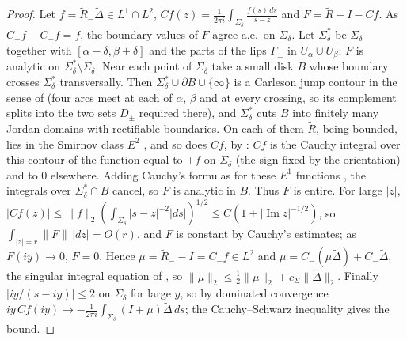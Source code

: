 \documentclass[11pt]{amsart}
\theoremstyle{definition}
\theoremstyle{remark}
\numberwithin{equation}{section}
\DeclareMathOperator{\im}{Im}
\begin{document}
\begin{proof}
Let $f=\widetilde R_-\widetilde\Delta\in L^1\cap L^2$, $Cf(z)=\frac1{2\pi i}\int_{\Sigma_\delta}\frac{f(s)\,ds}{s-z}$ and $F=\widetilde R-I-Cf$. As $C_+f-C_-f=f$, the boundary values of $F$ agree a.e.\ on $\Sigma_\delta$. Let $\Sigma_\delta^*$ be $\Sigma_\delta$ together with $[\alpha-\delta,\beta+\delta]$ and the parts of the lips $\Gamma_\pm$ in $U_\alpha\cup U_\beta$; $F$ is analytic on $\Sigma_\delta^*\setminus\Sigma_\delta$. Near each point of $\Sigma_\delta$ take a small disk $B$ whose boundary crosses $\Sigma_\delta^*$ transversally. Then $\Sigma_\delta^*\cup\partial B\cup\{\infty\}$ is a Carleson jump contour in the sense of \cite[\S3.2]{Le} (four arcs meet at each of $\alpha$, $\beta$ and at every crossing, so its complement splits into the two sets $D_\pm$ required there), and $\Sigma_\delta^*$ cuts $B$ into finitely many Jordan domains with rectifiable boundaries. On each of them $\widetilde R$, being bounded, lies in the Smirnov class $E^2$ \cite[\S2.3]{Le}, and so does $Cf$, by \cite[Theorem~4.1(b)]{Le}: $Cf$ is the Cauchy integral over this contour of the function equal to $\pm f$ on $\Sigma_\delta$ (the sign fixed by the orientation) and to $0$ elsewhere. Adding Cauchy's formulas for these $E^1$ functions \cite[Theorem~2.2(a)]{Le}, the integrals over $\Sigma_\delta^*\cap B$ cancel, so $F$ is analytic in $B$. Thus $F$ is entire. For large $|z|$, $|Cf(z)|\le\|f\|_2(\int_{\Sigma_\delta}|s-z|^{-2}|ds|)^{1/2}\le C(1+|\im z|^{-1/2})$, so $\int_{|z|=r}\|F\|\,|dz|=O(r)$, and $F$ is constant by Cauchy's estimates; as $F(iy)\to0$, $F=0$. Hence $\mu=\widetilde R_--I=C_-f\in L^2$ and $\mu=C_-(\mu\widetilde\Delta)+C_-\widetilde\Delta$, the singular integral equation of \cite[Proposition~5.8]{Le}, so $\|\mu\|_2\le\frac12\|\mu\|_2+c_\Sigma\|\widetilde\Delta\|_2$. Finally $|iy/(s-iy)|\le2$ on $\Sigma_\delta$ for large $y$, so by dominated convergence $iy\,Cf(iy)\to-\frac1{2\pi i}\int_{\Sigma_\delta}(I+\mu)\widetilde\Delta\,ds$; the Cauchy--Schwarz inequality gives the bound.
\end{proof}
\end{document}
